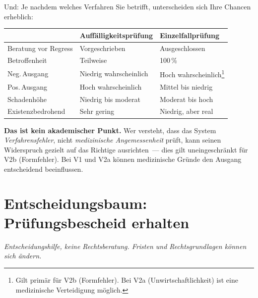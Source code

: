 \documentclass[a4paper]{umbruch-position}
\begin{document}
Und: Je nachdem welches Verfahren Sie betrifft, unterscheiden sich Ihre Chancen erheblich:

{\small
\begin{tabularx}{\textwidth}{p{3.5cm} X X}
\toprule
 & \textbf{Auff\"alligkeitspr\"ufung} & \textbf{Einzelfallpr\"ufung} \\
\midrule
Beratung vor Regress & Vorgeschrieben & Ausgeschlossen \\
Betroffenheit & Teilweise & 100\,\% \\
Neg.\,Ausgang & Niedrig wahrscheinlich & Hoch wahrscheinlich\footnote{Gilt prim\"ar f\"ur V2b (Formfehler). Bei V2a (Unwirtschaftlichkeit) ist eine medizinische Verteidigung m\"oglich.} \\
Pos.\,Ausgang & Hoch wahrscheinlich & Mittel bis niedrig \\
Schaden\-h\"ohe & Niedrig bis moderat & Moderat bis hoch \\
Existenz\-bedrohend & Sehr gering & Niedrig, aber real \\
\bottomrule
\end{tabularx}
}

\textbf{Das ist kein akademischer Punkt.} Wer versteht, dass das System \textit{Verfahrensfehler}, nicht \textit{medizinische Angemessenheit} pr\"uft, kann seinen Widerspruch gezielt auf das Richtige ausrichten~--- dies gilt uneingeschr\"ankt f\"ur V2b (Formfehler). Bei V1 und V2a k\"onnen medizinische Gr\"unde den Ausgang entscheidend beeinflussen.

\section{Entscheidungsbaum: \glqq{}Pr\"ufungsbescheid erhalten\grqq{}}

\begin{infobox}
\textit{Entscheidungshilfe, keine Rechtsberatung. Fristen und Rechtsgrundlagen k\"onnen sich \"andern.}
\end{infobox}
\end{document}
